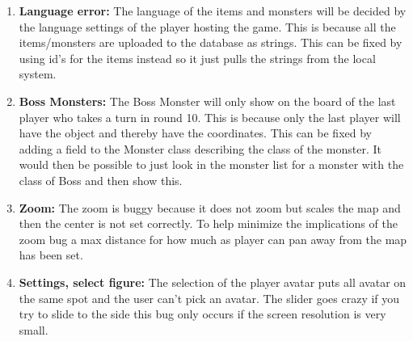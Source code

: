 \begin{enumerate}
	\item \textbf{Language error:} The language of the items and monsters will be decided by the language settings of the player hosting the game. This is because all the items/monsters are uploaded to the database as strings. This can be fixed by using id's for the items instead so it just pulls the strings from the local system.
	
	\item \textbf{Boss Monsters:} The Boss Monster will only show on the board of the last player who takes a turn in round 10. This is because only the last player will have the object and thereby have the coordinates. This can be fixed by adding a field to the Monster class describing the class of the monster. It would then be possible to just look in the monster list for a monster with the class of Boss and then show this.%
	
	\item \textbf{Zoom:} The zoom is buggy because it does not zoom but scales the map and then the center is not set correctly. To help minimize the implications of the zoom bug a max distance for how much as player can pan away from the map has been set.

	\item \textbf{Settings, select figure:} The selection of the player avatar puts all avatar on the same spot and the user can't pick an avatar. The slider goes crazy if you try to slide to the side this bug only occurs if the screen resolution is very small.
	
\end{enumerate}